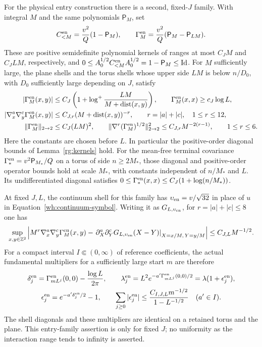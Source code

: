 \begin{lemma}
For the physical entry construction there is a second, fixed-$J$
family.  With integral $M$ and the same polynomials $\mathsf P_M$, set
\[
 C^{\rm en}_{<M}=\frac{v^2}{Q}(1-\mathsf P_M),\qquad
 \Gamma^{\rm en}_M=\frac{v^2}{Q}(\mathsf P_M-\mathsf P_{LM}).
\]
These are positive semidefinite polynomial kernels of ranges at most
$C_JM$ and $C_JLM$, respectively, and
$0\le A_0^{1/2}C^{\rm en}_{<M}A_0^{1/2}=1-\mathsf P_M\le\operatorname{Id}$.
For $M$ sufficiently large, the plane shells and the torus shells
whose upper side $LM$ is below $n/D_0$, with $D_0$ sufficiently large
depending on $J$, satisfy
\[
 \begin{split}
 |\Gamma^{\rm en}_M(x,y)|
  &\le C_J\left(1+\log^+\frac{LM}{M+\operatorname{dist}(x,y)}\right),
 \qquad \Gamma^{\rm en}_M(x,x)\ge c_J\log L,\\
 |\nabla_x^a\nabla_y^c\Gamma^{\rm en}_M(x,y)|
  &\le C_{J,r}(M+\operatorname{dist}(x,y))^{-r},
       \qquad r=|a|+|c|,\quad 1\le r\le12,\\
 \|\Gamma^{\rm en}_M\|_{2\to2}&\le C_J(LM)^2,\qquad
 \|\nabla^r(\Gamma^{\rm en}_M)^{1/2}\|_{2\to2}^2
       \le C_{J,r}M^{-2(r-1)},\qquad 1\le r\le6 .
 \end{split}
\]
Here the constants are chosen before $L$.  In particular the
positive-order diagonal bounds of Lemma~\ref{rg:kernels} hold.
For the mean-free terminal covariance
$\Gamma^{\rm en}_*=v^2\mathsf P_{M_*}/Q$ on a torus of side
$n\ge2M_*$, those diagonal and positive-order operator bounds hold
at scale $M_*$, with constants independent of $n/M_*$ and $L$.
Its undifferentiated diagonal satisfies
$0\le\Gamma_*^{\rm en}(x,x)\le C_J(1+\log(n/M_*))$.

At fixed $J,L$, the continuum shell for this family has
$\upsilon_{\rm en}=v/\sqrt{32}$ in place of $u$ in
Equation~\eqref{wh:continuum-symbol}.  Writing it as
$G_{L,\upsilon_{\rm en}}$, for $r=|a|+|c|\le8$ one has
\[
 \sup_{x,y\in\mathbb Z^2}\left|
 M^r\nabla_x^a\nabla_y^c\Gamma^{\rm en}_M(x,y)
 -\left.
   \partial_X^a\partial_Y^cG_{L,\upsilon_{\rm en}}(X-Y)
  \right|_{X=x/M,\,Y=y/M}\right|
 \le C_{J,L}M^{-1/2}.
\]
For a compact interval $I\Subset(0,\infty)$ of reference coefficients,
the actual fundamental multipliers for a sufficiently large start $m$
are therefore
\[
 \begin{gathered}
 \delta_j^{\rm en}=\Gamma^{\rm en}_{mL^j}(0,0)-\frac{\log L}{2\pi},
 \qquad
 \lambda_j^{\rm en}=L^2e^{-a'\Gamma^{\rm en}_{mL^j}(0,0)/2}
       =\lambda(1+\epsilon_j^{\rm en}),\\
 \epsilon_j^{\rm en}=e^{-a'\delta_j^{\rm en}/2}-1,\qquad
 \sum_{j\ge0}|\epsilon_j^{\rm en}|
 \le \frac{C_{I,J,L}m^{-1/2}}{1-L^{-1/2}}
       \quad(a'\in I).
 \end{gathered}
\]
The shell diagonals and these multipliers are identical on a retained
torus and the plane.  This entry-family assertion is only for fixed
$J$; no uniformity as the interaction range tends to infinity is
asserted.
\end{lemma}

